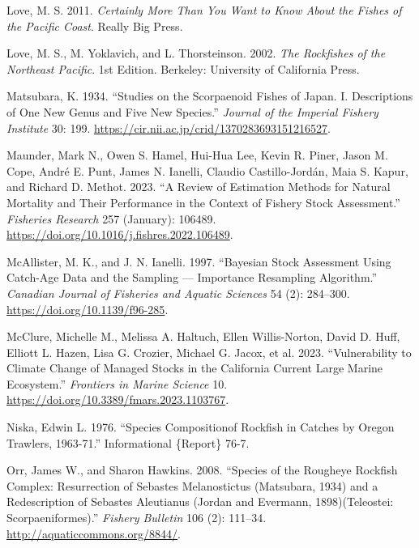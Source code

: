 \documentclass[
]{scrartcl}
\newlength{\cslhangindent}
\newenvironment{CSLReferences}[2] %
 {\begin{list}{}{%
  \setlength{\itemindent}{0pt}
  \setlength{\leftmargin}{0pt}
  \setlength{\parsep}{0pt}
  \ifodd #1
   \setlength{\leftmargin}{\cslhangindent}
   \setlength{\itemindent}{-1\cslhangindent}
  \fi
  \setlength{\itemsep}{#2\baselineskip}}}
 {\end{list}}
\begin{document}
\begin{CSLReferences}{1}{0}
Love, M. S. 2011. \emph{Certainly {More} {Than} {You} {Want} to {Know}
{About} the {Fishes} of the {Pacific} {Coast}}. Really Big Press.

Love, M. S., M. Yoklavich, and L. Thorsteinson. 2002. \emph{The
{Rockfishes} of the {Northeast} {Pacific}}. 1st Edition. Berkeley:
University of California Press.

Matsubara, K. 1934. {``Studies on the Scorpaenoid Fishes of Japan. I.
Descriptions of One New Genus and Five New Species.''} \emph{Journal of
the Imperial Fishery Institute} 30: 199.
\url{https://cir.nii.ac.jp/crid/1370283693151216527}.

Maunder, Mark N., Owen S. Hamel, Hui-Hua Lee, Kevin R. Piner, Jason M.
Cope, André E. Punt, James N. Ianelli, Claudio Castillo-Jordán, Maia S.
Kapur, and Richard D. Methot. 2023. {``A Review of Estimation Methods
for Natural Mortality and Their Performance in the Context of Fishery
Stock Assessment.''} \emph{Fisheries Research} 257 (January): 106489.
\url{https://doi.org/10.1016/j.fishres.2022.106489}.

McAllister, M. K., and J. N. Ianelli. 1997. {``Bayesian Stock Assessment
Using Catch-Age Data and the Sampling --- Importance Resampling
Algorithm.''} \emph{Canadian Journal of Fisheries and Aquatic Sciences}
54 (2): 284--300. \url{https://doi.org/10.1139/f96-285}.

McClure, Michelle M., Melissa A. Haltuch, Ellen Willis-Norton, David D.
Huff, Elliott L. Hazen, Lisa G. Crozier, Michael G. Jacox, et al. 2023.
{``Vulnerability to Climate Change of Managed Stocks in the {California
Current} Large Marine Ecosystem.''} \emph{Frontiers in Marine Science}
10. \url{https://doi.org/10.3389/fmars.2023.1103767}.

Niska, Edwin L. 1976. {``Species {Compositionof} Rockfish in Catches by
{Oregon} {Trawlers}, 1963-71.''} Informational \{Report\} 76-7.

Orr, James W., and Sharon Hawkins. 2008. {``Species of the Rougheye
Rockfish Complex: Resurrection of {Sebastes} Melanostictus ({Matsubara},
1934) and a Redescription of {Sebastes} Aleutianus ({Jordan} and
{Evermann}, 1898)({Teleostei}: {Scorpaeniformes}).''} \emph{Fishery
Bulletin} 106 (2): 111--34. \url{http://aquaticcommons.org/8844/}.


\end{CSLReferences}
\end{document}
